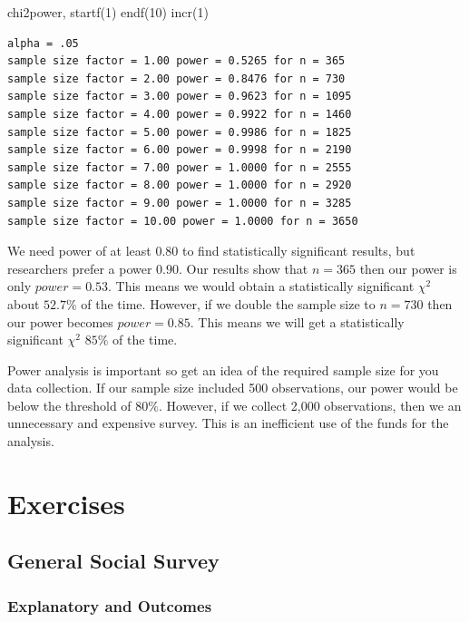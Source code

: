 \documentclass[
]{book}
\newenvironment{Shaded}{\begin{snugshade}}{\end{snugshade}}
\newcommand{\NormalTok}[1]{#1}
\begin{document}
\begin{Shaded}
\begin{Highlighting}[]
\NormalTok{chi2power, startf(1) endf(10) incr(1)}
\end{Highlighting}
\end{Shaded}

\begin{verbatim}
alpha = .05
sample size factor = 1.00 power = 0.5265 for n = 365
sample size factor = 2.00 power = 0.8476 for n = 730
sample size factor = 3.00 power = 0.9623 for n = 1095
sample size factor = 4.00 power = 0.9922 for n = 1460
sample size factor = 5.00 power = 0.9986 for n = 1825
sample size factor = 6.00 power = 0.9998 for n = 2190
sample size factor = 7.00 power = 1.0000 for n = 2555
sample size factor = 8.00 power = 1.0000 for n = 2920
sample size factor = 9.00 power = 1.0000 for n = 3285
sample size factor = 10.00 power = 1.0000 for n = 3650
\end{verbatim}

We need power of at least \(0.80\) to find statistically significant results, but researchers prefer a power \(0.90\). Our results show that \(n=365\) then our power is only \(power=0.53\). This means we would obtain a statistically significant \(\chi^2\) about \(52.7\%\) of the time. However, if we double the sample size to \(n=730\) then our power becomes \(power=0.85\). This means we will get a statistically significant \(\chi^2\) \(85\%\) of the time.

Power analysis is important so get an idea of the required sample size for you data collection. If our sample size included 500 observations, our power would be below the threshold of \(80\%\). However, if we collect 2,000 observations, then we an unnecessary and expensive survey. This is an inefficient use of the funds for the analysis.

\chapter{Exercises}\label{exercises}

\section{General Social Survey}\label{general-social-survey}

\subsection{Explanatory and Outcomes}\label{explanatory-and-outcomes}
\end{document}
